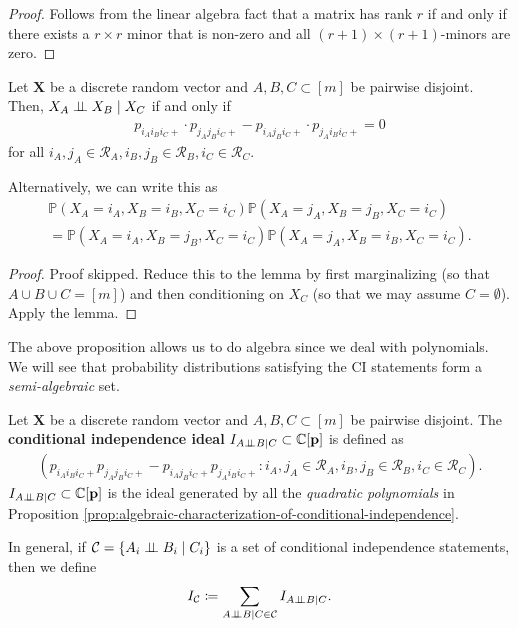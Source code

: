 \begin{proof}
  Follows from the linear algebra fact that a matrix has rank \( r \) if and only if there exists a \( r \times r \) minor that is non-zero and all \( (r+1)\times(r+1) \)-minors are zero.
\end{proof}

\begin{prop}\label{prop:algebraic-characterization-of-conditional-independence}
Let \(\mathbf X \) be a discrete random vector and \( A,B,C \subset [m] \) be pairwise disjoint. Then, \( X_A \perp \!\!\! \perp X_B \mid X_C \) if and only if 
\begin{align*}
  p_{i_A i_B i_C +} \cdot p_{j_Aj_Bi_C +} - p_{i_A j_B i_C + } \cdot p_{j_A i_B i_C + }  = 0
\end{align*}
for all \( i_A, j_A \in \mathcal{R}_A, i_B, j_B \in \mathcal{R}_B , i_C \in \mathcal{R}_C\).

Alternatively, we can write this as
\begin{align*}
  \mathbb P(X_A = i_A, X_B = i_B, X_C = i_C) \mathbb P(X_A = j_A, X_B = j_B, X_C = i_C) \\ =  \mathbb P(X_A = i_A, X_B = j_B, X_C = i_C)
  \mathbb P(X_A = j_A, X_B = i_B, X_C = i_C).
\end{align*}
\end{prop}

\begin{proof}
  Proof skipped.  Reduce this to the lemma by first marginalizing (so that \( A \cup B \cup C = [m] \)) and then conditioning on \( X_C \) (so that we may assume \( C = \emptyset \)). Apply the lemma.
\end{proof}


The above proposition allows us to do algebra since we deal with polynomials. We will see that probability distributions satisfying the CI statements form a \emph{semi-algebraic} set.

\begin{defi}
  Let \( \mathbf X \) be a discrete random vector and \( A,B,C \subset [m] \) be pairwise disjoint. The \textbf{conditional independence ideal} \( I_{A \perp \!\!\! \perp B \mid C} \subset \mathbb C [\mathbf p] \) is defined as
  \begin{align*}
    (p_{i_A i_B i_C +} p_{j_Aj_Bi_C +} - p_{i_A j_B i_C + }  p_{j_A i_B i_C + } : i_A, j_A \in \mathcal{R}_A, i_B, j_B \in \mathcal{R}_B , i_C \in \mathcal{R}_C).
  \end{align*}
  \( I_{A \perp \!\!\! \perp B \mid C} \subset \mathbb C [\mathbf p] \) is the ideal generated by all the \emph{quadratic polynomials} in Proposition \ref{prop:algebraic-characterization-of-conditional-independence}.

  In general, if \( \mathcal C = \{ A_i \perp \!\!\! \perp B_i \mid C_i \} \) is a set of conditional independence statements, then we define
  \begin{align*}
    I_{\mathcal{C}} \coloneqq \sum_{A \perp \!\!\! \perp B \mid C \in \mathcal C} I_{A \perp \!\!\! \perp B \mid C}.
  \end{align*}
\end{defi}

